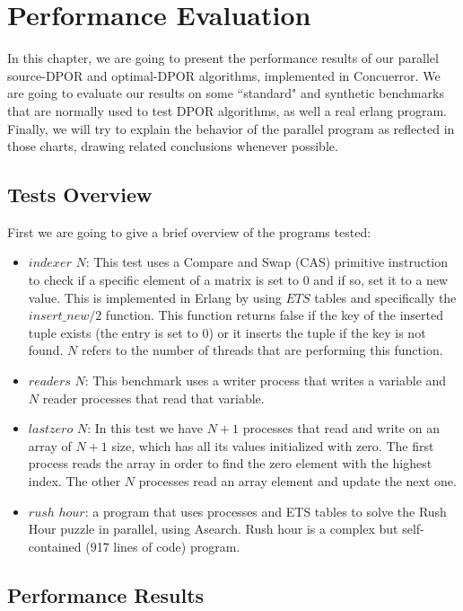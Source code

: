 \chapter{Performance Evaluation}
\label{perfresults}

In this chapter, we are going to present the performance results of our parallel source-DPOR and optimal-DPOR algorithms,
implemented in Concuerror. We are going to evaluate our results on some ``standard" and synthetic benchmarks that are normally
used to test DPOR algorithms, as well a real erlang program. Finally, we will try to explain the behavior of the parallel program as reflected in those
charts, drawing related conclusions whenever possible.

\section{Tests Overview}

First we are going to give a brief overview of the programs tested:

\begin{itemize}
    \item $indexer$ $N$: This test uses a Compare and Swap (CAS) primitive instruction to check if a specific element of
    a matrix is set to 0 and if so, set it to a new value. This is implemented in Erlang by using $ETS$ tables and specifically
    the $insert\_new/2$ function. This function returns false if the key of the inserted tuple exists (the entry is set to 0)
    or it inserts the tuple if the key is not found. $N$ refers to the number of threads that are performing this function.
    \item $readers$ $N$: This benchmark uses a writer process that writes a variable and $N$ reader processes that read that variable.
    \item $ lastzero$ $N$: In this test we have $N+1$ processes that read and write on an array of $N+1$ size, which has all its 
    values initialized with zero. The first process reads the array in order to find the zero element with the highest
    index. The other $N$ processes read an array element and update the next one.
    \item $rush$ $hour$: a program that uses processes and
    ETS tables to solve the Rush Hour puzzle in parallel, using A\textasteriskcentered  search. Rush hour is a complex but self-contained (917 lines of code) program.
\end{itemize}

\section{Performance Results}

